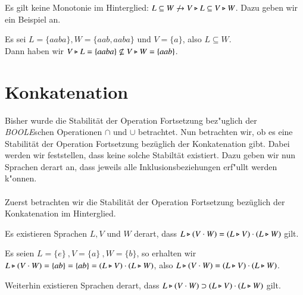Es gilt keine Monotonie im Hinterglied: $L\subseteq W \not\to V\triangleright L \subseteq V \triangleright W$. Dazu geben wir ein Beispiel an.

\vspace{2ex}

\begin{beispiel}
Es sei $L=\{aaba\},W=\{aab,aaba\}$ und $V=\{a\}$, also $L\subseteq W$.\\
Dann haben wir $V\triangleright L = \{aaba\} \not\subseteq V\triangleright W =\{aab\}$.
\end{beispiel}



\section{Konkatenation}
Bisher wurde die Stabilität der Operation Fortsetzung bez"uglich der \emph{BOOLE}schen Operationen $\cap$ und $\cup$ betrachtet.
Nun betrachten wir, ob es eine Stabilität der Operation Fortsetzung bezüglich der Konkatenation gibt.
Dabei werden wir feststellen, dass keine solche Stabiltät existiert. Dazu geben wir nun Sprachen derart an, dass jeweils alle Inklusionsbeziehungen erf"ullt werden k"onnen.\\\\
Zuerst betrachten wir die Stabilität der Operation Fortsetzung bezüglich der Konkatenation im Hinterglied.

Es existieren Sprachen $L,V$ und $W$ derart, dass $L\triangleright (V\cdot W) = (L\triangleright V) \cdot (L\triangleright W)$ gilt.

\vspace{2ex}

\begin{beispiel}
Es seien  $L=\{e\}\ ,V=\{a\}\ ,W=\{b\} $, so erhalten wir \\
$L\triangleright (V\cdot W) = \{ ab\} =  \{ab\} = (L\triangleright V) \cdot (L\triangleright W)$, also $L\triangleright (V\cdot W) = (L\triangleright V) \cdot (L\triangleright W)$.
\end{beispiel}
Weiterhin existieren Sprachen derart, dass $L\triangleright (V\cdot W) \supset (L\triangleright V) \cdot (L\triangleright W)$ gilt.

